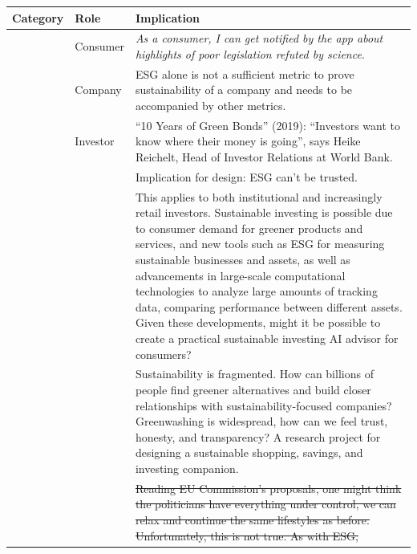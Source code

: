 \documentclass[
  letterpaper,
  DIV=11,
  numbers=noendperiod]{scrartcl}
\renewcommand{\st}[1]{\sout{#1}}
\begin{document}
\begin{longtable}[]{@{}
  >{\raggedright\arraybackslash}p{}
  >{\raggedright\arraybackslash}p{}
  >{\raggedright\arraybackslash}p{}@{}}
\toprule\noalign{}
\begin{minipage}[b]{\linewidth}\raggedright
Category
\end{minipage} & \begin{minipage}[b]{\linewidth}\raggedright
Role
\end{minipage} & \begin{minipage}[b]{\linewidth}\raggedright
Implication
\end{minipage} \\
\midrule\noalign{}
\endhead
\bottomrule\noalign{}
\endlastfoot
& Consumer & \emph{As a consumer, I can get notified by the app about
highlights of poor legislation refuted by science}. \\
& Company & ESG alone is not a sufficient metric to prove sustainability
of a company and needs to be accompanied by other metrics. \\
& Investor & {``10 {Years} of {Green Bonds}''} (2019): ``Investors want
to know where their money is going'', says Heike Reichelt, Head of
Investor Relations at World Bank. \\
& & Implication for design: ESG can't be trusted. \\
& & This applies to both institutional and increasingly retail
investors. Sustainable investing is possible due to consumer demand for
greener products and services, and new tools such as ESG for measuring
sustainable businesses and assets, as well as advancements in
large-scale computational technologies to analyze large amounts of
tracking data, comparing performance between different assets. Given
these developments, might it be possible to create a practical
sustainable investing AI advisor for consumers? \\
& & Sustainability is fragmented. How can billions of people find
greener alternatives and build closer relationships with
sustainability-focused companies? Greenwashing is widespread, how can we
feel trust, honesty, and transparency? A research project for designing
a sustainable shopping, savings, and investing companion. \\
& & \st{Reading EU Commission's proposals, one might think the
politicians have everything under control, we can relax and continue the
same lifestyles as before. Unfortunately, this is not true. As with ESG,
}
\end{longtable}
\end{document}
